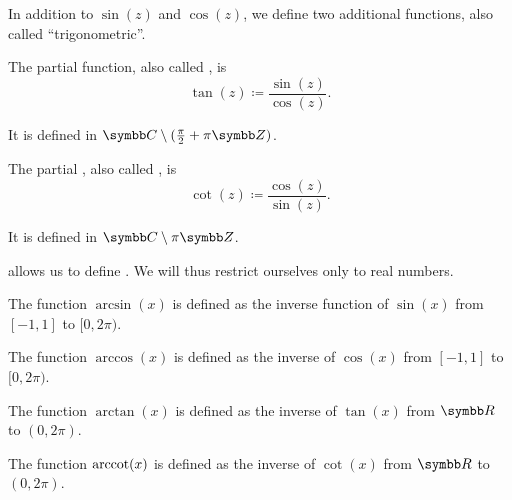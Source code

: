 \begin{definition}\label{def:derived_trigonometric_functions}
  In addition to \( \sin(z) \) and \( \cos(z) \), we define two additional functions, also called \enquote{trigonometric}.

  \begin{defenum}
     The partial  function, also called , is
    \begin{equation*}
      \tan(z) \coloneqq \frac {\sin(z)} {\cos(z)}.
    \end{equation*}

    It is defined in \( \BC \setminus (\tfrac \pi 2 + \pi\BZ) \).

     The partial , also called , is
    \begin{equation*}
      \cot(z) \coloneqq \frac {\cos(z)} {\sin(z)}.
    \end{equation*}

    It is defined in \( \BC \setminus \pi\BZ \).
  \end{defenum}
\end{definition}

\begin{definition}\label{def:inverse_trigonometric_functions}
   allows us to define . We will thus restrict ourselves only to real numbers.

  \begin{defenum}
     The  function \( \arcsin(x) \) is defined as the inverse function of \( \sin(x) \) from \( [-1, 1] \) to \( [0, 2\pi) \).

     The  function \( \arccos(x) \) is defined as the inverse of \( \cos(x) \) from \( [-1, 1] \) to \( [0, 2\pi) \).

     The  function \( \arctan(x) \) is defined as the inverse of \( \tan(x) \) from \( \BR \) to \( (0, 2\pi) \).

     The  function \( \operatorname{arccot}(x) \) is defined as the inverse of \( \cot(x) \) from \( \BR \) to \( (0, 2\pi) \).
  \end{defenum}
\end{definition}
